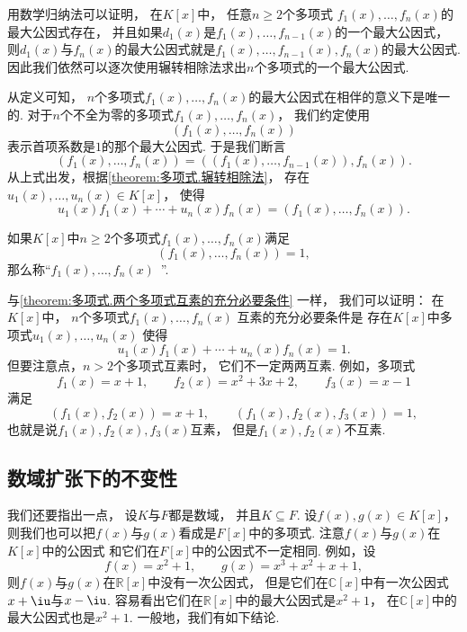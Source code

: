 用数学归纳法可以证明，
在\(K[x]\)中，
任意\(n\geq2\)个多项式
\(f_1(x),\dotsc,f_n(x)\)的最大公因式存在，
并且如果\(d_1(x)\)是\(f_1(x),\dotsc,f_{n-1}(x)\)的一个最大公因式，
则\(d_1(x)\)与\(f_n(x)\)的最大公因式就是\(f_1(x),\dotsc,f_{n-1}(x),f_n(x)\)的最大公因式.
因此我们依然可以逐次使用辗转相除法求出\(n\)个多项式的一个最大公因式.

从定义可知，
\(n\)个多项式\(f_1(x),\dotsc,f_n(x)\)的最大公因式在相伴的意义下是唯一的.
对于\(n\)个不全为零的多项式\(f_1(x),\dotsc,f_n(x)\)，
我们约定使用\[
	(f_1(x),\dotsc,f_n(x))
\]表示首项系数是\(1\)的那个最大公因式.
于是我们断言\[
	(f_1(x),\dotsc,f_n(x))
	= ((f_1(x),\dotsc,f_{n-1}(x)),f_n(x)).
\]
从上式出发，根据\cref{theorem:多项式.辗转相除法}，
存在\(u_1(x),\dotsc,u_n(x) \in K[x]\)，
使得\[
	u_1(x) f_1(x) + \dotsb + u_n(x) f_n(x)
	= (f_1(x),\dotsc,f_n(x)).
\]

\begin{definition}
如果\(K[x]\)中\(n\geq2\)个多项式\(f_1(x),\dotsc,f_n(x)\)满足\[
	(f_1(x),\dotsc,f_n(x)) = 1,
\]
那么称“\(f_1(x),\dotsc,f_n(x)\)~”.
\end{definition}

与\cref{theorem:多项式.两个多项式互素的充分必要条件} 一样，
我们可以证明：
在\(K[x]\)中，
\(n\)个多项式\(f_1(x),\dotsc,f_n(x)\)
互素的充分必要条件是
存在\(K[x]\)中多项式\(u_1(x),\dotsc,u_n(x)\)
使得\[
	u_1(x) f_1(x) + \dotsb + u_n(x) f_n(x) = 1.
\]
但要注意点，\(n>2\)个多项式互素时，
它们不一定两两互素.
例如，多项式\[
	f_1(x) = x+1, \qquad
	f_2(x) = x^2+3x+2, \qquad
	f_3(x) = x-1
\]满足\[
	(f_1(x),f_2(x))=x+1, \qquad
	(f_1(x),f_2(x),f_3(x))=1,
\]
也就是说\(f_1(x),f_2(x),f_3(x)\)互素，
但是\(f_1(x),f_2(x)\)不互素.

\subsection{数域扩张下的不变性}
我们还要指出一点，
设\(K\)与\(F\)都是数域，
并且\(K \subseteq F\).
设\(f(x),g(x) \in K[x]\)，
则我们也可以把\(f(x)\)与\(g(x)\)看成是\(F[x]\)中的多项式.
注意\(f(x)\)与\(g(x)\)在\(K[x]\)中的公因式
和它们在\(F[x]\)中的公因式不一定相同.
例如，设\[
	f(x) = x^2+1, \qquad
	g(x) = x^3+x^2+x+1,
\]
则\(f(x)\)与\(g(x)\)在\(\mathbb{R}[x]\)中没有一次公因式，
但是它们在\(\mathbb{C}[x]\)中有一次公因式\(x+\iu\)与\(x-\iu\).
容易看出它们在\(\mathbb{R}[x]\)中的最大公因式是\(x^2+1\)，
在\(\mathbb{C}[x]\)中的最大公因式也是\(x^2+1\).
一般地，我们有如下结论.

